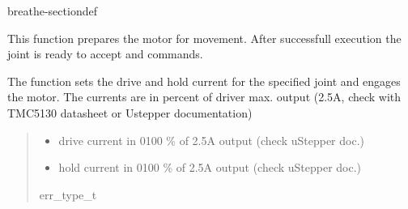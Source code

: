 \documentclass[letterpaper,10pt,english]{sphinxmanual}
\begin{document}
\begin{fulllineitems}
\begin{sphinxuseclass}{breathe-sectiondef}
\begin{fulllineitems}
\sphinxAtStartPar
This function prepares the motor for movement. After successfull execution the joint is ready to accept {\hyperref[\detokenize{code/bioscara_hardware_drivers/index:classbioscara__hardware__drivers_1_1MockJoint_1a032944df226bfeb7e00d2de2429e5376}]{}} and {\hyperref[\detokenize{code/bioscara_hardware_drivers/index:classbioscara__hardware__drivers_1_1MockJoint_1a3b44b1fb7d8d689a8ea07fa433d53cdb}]{}} commands.

\sphinxAtStartPar
The function sets the drive and hold current for the specified joint and engages the motor. The currents are in percent of driver max. output (2.5A, check with TMC5130 datasheet or Ustepper documentation) 
\begin{quote}\begin{description}
\begin{itemize}
\item {} 
\sphinxAtStartPar
{} \textendash{} drive current in 0\sphinxhyphen{}100 \% of 2.5A output (check uStepper doc.) 

\item {} 
\sphinxAtStartPar
{} \textendash{} hold current in 0\sphinxhyphen{}100 \% of 2.5A output (check uStepper doc.) 

\end{itemize}

\sphinxAtStartPar
err\_type\_t 

\end{description}\end{quote}

\end{fulllineitems}



\end{sphinxuseclass}
\end{fulllineitems}
\end{document}
